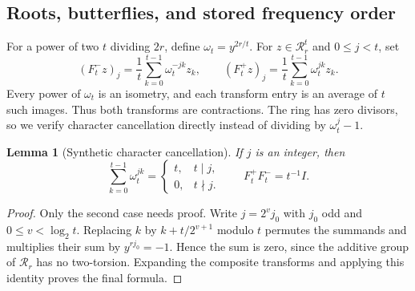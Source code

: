 \documentclass[11pt]{article}
\newtheorem{lemma}[theorem]{Lemma}
\theoremstyle{definition}
\begin{document}
\subsection{Roots, butterflies, and stored frequency order}

For a power of two $t$ dividing $2r$, define $\omega_t=y^{2r/t}$.
For $z\in\mathcal R_r^t$ and $0\leq j<t$, set
\[
 (F_t^-z)_j=\frac1t\sum_{k=0}^{t-1}\omega_t^{-jk}z_k,
 \qquad
 (F_t^+z)_j=\frac1t\sum_{k=0}^{t-1}\omega_t^{jk}z_k.
\]
Every power of $\omega_t$ is an isometry, and each transform entry is
an average of $t$ such images.  Thus both transforms are contractions.
The ring has zero divisors, so we verify character cancellation
directly instead of dividing by $\omega_t^j-1$.

\begin{lemma}[Synthetic character cancellation]
\label{lem:synthetic-characters}
If $j$ is an integer, then
\[
 \sum_{k=0}^{t-1}\omega_t^{jk}
 =\begin{cases}t,&t\mid j,\\0,&t\nmid j.\end{cases}
 \qquad F_t^+F_t^-=t^{-1}I.
\]
\end{lemma}
\begin{proof}
Only the second case needs proof.  Write $j=2^v j_0$ with $j_0$ odd
and $0\leq v<\log_2t$.  Replacing $k$ by $k+t/2^{v+1}$ modulo $t$ permutes
the summands and multiplies their sum by
$y^{rj_0}=-1$.  Hence the sum is zero, since the additive group of
$\mathcal R_r$ has no two-torsion.  Expanding the composite transforms
and applying this identity proves the final formula.
\end{proof}
\end{document}
